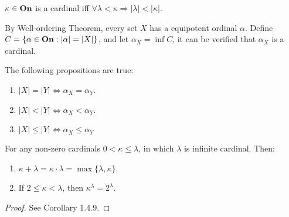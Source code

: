\begin{definition}
  $\kappa \in \boldsymbol{\mathrm{On}}$ is a cardinal iff $\forall \lambda < \kappa \Rightarrow |\lambda| < |\kappa|$.
\end{definition}

By Well-ordering Theorem, every set $X$ has a equipotent ordinal $\alpha$. Define $C = \{ \alpha \in \boldsymbol{\mathrm{On}}: |\alpha| = |X| \}$, and let $\alpha_X = \inf C$, it can be verified that $\alpha_X$ is a cardinal.


\begin{proposition}
  The following propositions are true:
  \begin{enumerate}
    \item $|X| = |Y| \Leftrightarrow \alpha_X = \alpha_Y$.
    \item $|X| < |Y| \Leftrightarrow \alpha_X < \alpha_Y$.
    \item $|X| \leq |Y| \Leftrightarrow \alpha_X \leq \alpha_Y$
  \end{enumerate}
\end{proposition}







\begin{proposition}
  For any non-zero cardinals $0 < \kappa \leq \lambda$, in which $\lambda$ is infinite cardinal. Then:
  \begin{enumerate}
    \item $\kappa + \lambda = \kappa \cdot \lambda = \max\{ \lambda, \kappa \}$.
    \item If $2 \leq \kappa < \lambda$, then $\kappa^{\lambda} = 2^{\lambda}$.
  \end{enumerate}
\end{proposition}
\begin{proof}
  See \cite{LWW_AJM} Corollary 1.4.9.
\end{proof}




